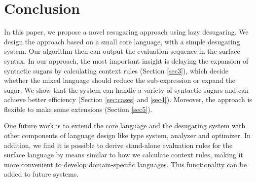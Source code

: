 \section{Conclusion}
\label{sec7}


In this paper, we propose a novel resugaring approach using lazy desugaring. We design the approach based on a small core language, with a simple desugaring system. Our algorithm then can output the evaluation sequence in the surface syntax. In our approach, the most important insight is delaying the expansion of syntactic sugars by calculating context rules (Section \ref{sec3}), which decide whether the mixed language should reduce the sub-expression or expand the sugar. We show that the system can handle a variety of syntactic sugars and can achieve better efficiency (Section \ref{sec:cases} and \ref{sec4}). Moreover, the approach is flexible to make some extensions (Section \ref{sec5}).

One future work is to extend the core language and the desugaring system with other components of language design like type system, analyzer and optimizer. In addition, we find it is possible to derive stand-alone evaluation rules for the surface language by means similar to how we calculate context rules, making it more convenient to develop domain-specific languages. This functionality can be added to future systems.
